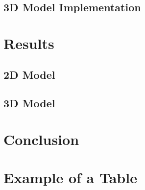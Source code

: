 \documentclass{UoNMCHA}
\begin{document}
		\subsection{3D Model Implementation}
			
			
	\newpage\section{Results}\label{sec:Results}
		\subsection{2D Model}
			
		\subsection{3D Model}
			
	
	
	\newpage\section{Conclusion}\label{sec:Conclusion}
		

	\newpage %
		

	\appendix
		\newpage\section{Example of a Table}\label{app:Table}
\end{document}
